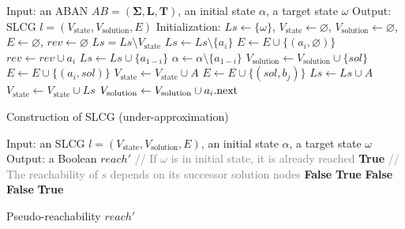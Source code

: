 \begin{algorithm}[ht]
\begin{algorithmic}
\State Input: an ABAN $AB=(\mathbf{\Sigma},\mathbf{L},\mathbf{T})$, an initial state $\alpha$, a target state $\omega$
\State Output: SLCG $l=(V_{\mathrm{state}},V_{\mathrm{solution}}, E)$
\State Initialization: 
$Ls\gets \{\omega\}$, $V_{\mathrm{state}}\gets\varnothing$, $V_{\mathrm{solution}}\gets \varnothing$, $E\gets \varnothing$, $rev\gets \varnothing$
    \State $Ls=Ls\setminus V_{\mathrm{state}}$
		\State $Ls\gets Ls\setminus \{a_i\}$
			\State $E\gets E\cup \{(a_i,\varnothing)\}$
			\State $rev\gets rev\cup a_i$
    	\Else
    	        \State $Ls\gets Ls\cup \{a_{1-i}\}$
    	        \State $\alpha\gets\alpha\setminus\{a_{1-i}\}$
    	    \EndIf
    	    \State{\textcolor{gray}{// Choose the transitions reaching $a_i$}}
    		    \State $V_{\mathrm{solution}}\gets V_{\mathrm{solution}}\cup \{sol\}$
    		    \State $E\gets E\cup \{(a_i,sol)\} $
    			\State $V_{\mathrm{state}}\gets V_{\mathrm{state}}\cup {A}$
    				\State $E\gets E\cup \{(sol,b_j)\} $
    			\EndFor
    			\State $Ls\gets Ls\cup A$
                \State $V_{\mathrm{state}}\gets V_{\mathrm{state}}\cup Ls$
    		\EndFor
    		\State$V_{\mathrm{solution}}\gets V_{\mathrm{solution}}\cup a_i{\rm .next}$           
    	\EndIf
	\EndFor
\EndWhile
\State{}
\end{algorithmic}
\caption{Construction of SLCG (under-approximation)}\label{AlgConstructLCGUnder}
\end{algorithm}

\begin{algorithm}[ht]
\begin{algorithmic}
\State Input: an SLCG $l=(V_{\mathrm{state}}, {V_\mathrm{solution}},E)$, an initial state $\alpha$, a target state $\omega$
\State Output: a Boolean $reach'$
\State \textcolor{gray}{// If $\omega$ is in initial state, it is already reached}
\If {$\omega\in \alpha$}
   \Return \textbf{True}
\EndIf
\State \textcolor{gray}{// The reachability of $s$ depends on its successor solution nodes}
    \Return \textbf{False}
\EndIf
{}
    \Return \textbf{True}
    \EndIf
\EndFor
 \Return \textbf{False}
\EndProcedure
{}
    \Return \textbf{False}
    \EndIf
\EndFor
\Return \textbf{True}
\EndProcedure
\end{algorithmic}
\caption{Pseudo-reachability $reach'$}\label{algPseudo}
\end{algorithm}

